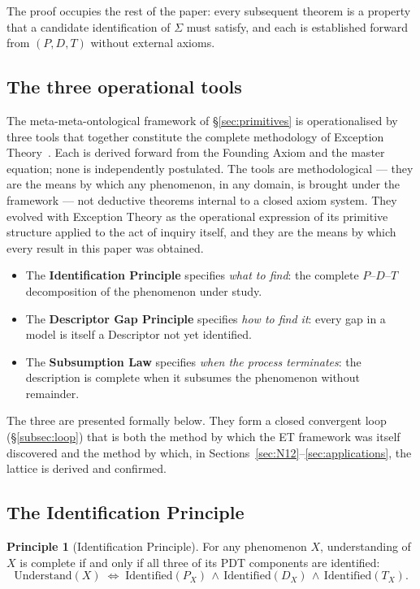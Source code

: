 \documentclass[11pt,a4paper]{article}
\theoremstyle{definition}
\newtheorem{principle}[theorem]{Principle}
\theoremstyle{remark}
\begin{document}
The proof occupies the rest of the paper: every subsequent theorem is a property that a candidate identification of $\Sigma$ must satisfy, and each is established forward from $(P,D,T)$ without external axioms.


\subsection{The three operational tools}\label{subsec:three-tools}

The meta-meta-ontological framework of \S\ref{sec:primitives} is operationalised by three tools that together constitute the complete methodology of Exception Theory~\cite{ThreeTools}. Each is derived forward from the Founding Axiom and the master equation; none is independently postulated. The tools are methodological --- they are the means by which any phenomenon, in any domain, is brought under the framework --- not deductive theorems internal to a closed axiom system. They evolved with Exception Theory as the operational expression of its primitive structure applied to the act of inquiry itself, and they are the means by which every result in this paper was obtained.

\begin{itemize}[leftmargin=*]
\item The \textbf{Identification Principle} specifies \emph{what to find}: the complete $P$--$D$--$T$ decomposition of the phenomenon under study.
\item The \textbf{Descriptor Gap Principle} specifies \emph{how to find it}: every gap in a model is itself a Descriptor not yet identified.
\item The \textbf{Subsumption Law} specifies \emph{when the process terminates}: the description is complete when it subsumes the phenomenon without remainder.
\end{itemize}

The three are presented formally below. They form a closed convergent loop (\S\ref{subsec:loop}) that is both the method by which the ET framework was itself discovered and the method by which, in Sections~\ref{sec:N12}--\ref{sec:applications}, the lattice is derived and confirmed.

\subsection{The Identification Principle}\label{subsec:identification}

\begin{principle}[Identification Principle]\label{princ:identification}
For any phenomenon $X$, understanding of $X$ is complete if and only if all three of its PDT components are identified:
\[
\boxed{\;\mathrm{Understand}(X) \;\iff\; \mathrm{Identified}(P_{X}) \,\land\, \mathrm{Identified}(D_{X}) \,\land\, \mathrm{Identified}(T_{X}).\;}
\]
\end{principle}
\end{document}
